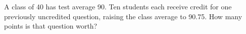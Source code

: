 A class of 40 has test average 90. Ten students each receive credit for one previously uncredited question, raising the class average to 90.75. How many points is that question worth?
